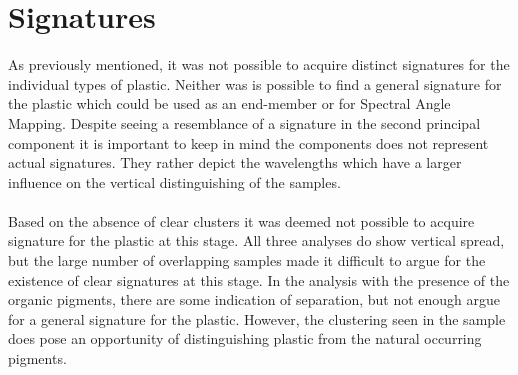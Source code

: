 \section{Signatures}
As previously mentioned, it was not possible to acquire distinct signatures for the individual types of plastic. Neither was is possible to find a general signature for the plastic which could be used as an end-member or for Spectral Angle Mapping. Despite seeing a resemblance of a signature in the second principal component it is important to keep in mind the components does not represent actual signatures. They rather depict the wavelengths which have a larger influence on the vertical distinguishing of the samples.
\\\\
Based on the absence of clear clusters it was deemed not possible to acquire signature for the plastic at this stage. All three analyses do show vertical spread, but the large number of overlapping samples made it difficult to argue for the existence of clear signatures at this stage. In the analysis with the presence of the organic pigments, there are some indication of separation, but not enough argue for a general signature for the plastic. However, the clustering seen in the sample does pose an opportunity of distinguishing plastic from the natural occurring pigments.